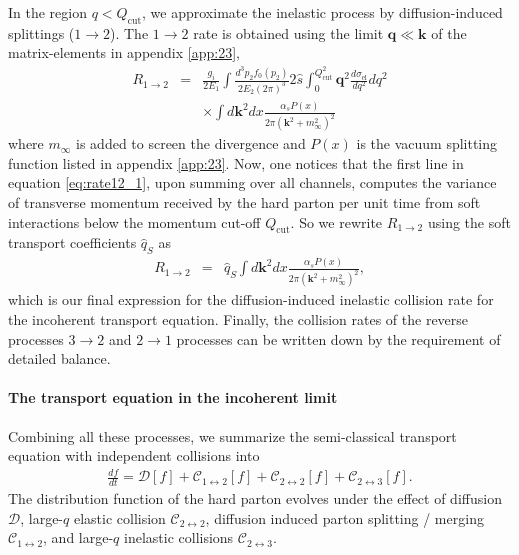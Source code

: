 \documentclass[aps, prc, reprint, amsmath, groupedaddress, nofootinbib]{revtex4-1}
\begin{document}
In the region $q<Q_{\textrm{cut}}$, we approximate the inelastic process by diffusion-induced splittings ($1 \rightarrow 2$). 
The $1 \rightarrow 2$ rate is obtained using the limit $\mathbf{q} \ll \mathbf{k}$ of the matrix-elements in appendix \ref{app:23},
\begin{eqnarray}\nonumber
R_{1\rightarrow 2} &=& \frac{g_i}{2E_1}\int  \frac{d^3p_2f_0(p_2)}{2E_2(2\pi)^3} 2\hat{s} \int_{0}^{Q_{\textrm{cut}}^2} \mathbf{q}^2 \frac{d\sigma_{\textrm{el}}}{dq^2} dq^2 
\\
&& \times \int d \mathbf{k}^2 dx \frac{\alpha_s P(x) }{2\pi (\mathbf{k}^2 + m_\infty^2)^2} \label{eq:rate12_1}
\end{eqnarray}
where $m_\infty$ is added to screen the divergence and $P(x)$ is the vacuum splitting function listed in appendix \ref{app:23}.
Now, one notices that the first line in equation \ref{eq:rate12_1}, upon summing over all channels, computes the variance of transverse momentum received by the hard parton per unit time from soft interactions below the momentum cut-off $Q_{\textrm{cut}}$.
So we rewrite $R_{1\rightarrow 2}$ using the soft transport coefficients $\hat{q}_{S}$ as
\begin{eqnarray}
R_{1\rightarrow 2} &=& \hat{q}_S\int d \mathbf{k}^2 dx \frac{\alpha_s P(x) }{2\pi (\mathbf{k}^2 + m_\infty^2)^2} \label{eq:rate12_2},
\end{eqnarray}
which is our final expression for the diffusion-induced inelastic collision rate for the incoherent transport equation.
Finally, the collision rates of the reverse processes $3\rightarrow 2$ and $2\rightarrow 1$ processes can be written down by the requirement of detailed balance.

\paragraph{The transport equation in the incoherent limit}
Combining all these processes, we summarize the semi-classical transport equation with independent collisions into
\begin{eqnarray}\label{eq:incoh_transport}
\frac{df}{dt} = \mathcal{D}[f] + \mathcal{C}_{1\leftrightarrow 2}[f] + \mathcal{C}_{2\leftrightarrow 2}[f] + \mathcal{C}_{2\leftrightarrow 3}[f].
\end{eqnarray}
The distribution function of the hard parton evolves under the effect of diffusion $\mathcal{D}$, large-$q$ elastic collision $\mathcal{C}_{2\leftrightarrow 2}$,  diffusion induced parton splitting / merging $\mathcal{C}_{1\leftrightarrow 2}$, and large-$q$ inelastic collisions $\mathcal{C}_{2\leftrightarrow 3}$. 
\end{document}
